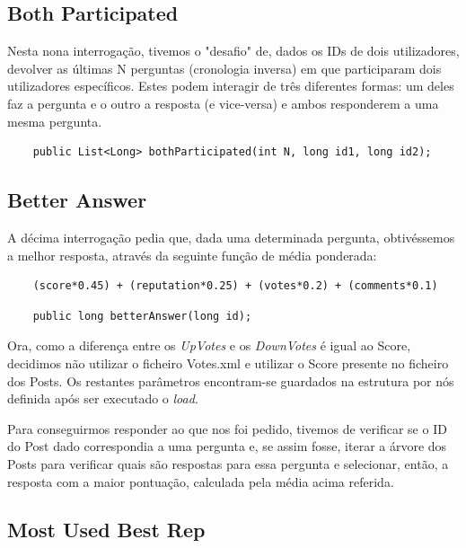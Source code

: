 \documentclass[a4paper, 11pt, oneside]{article}
\begin{document}
\subsection{Both Participated}

Nesta nona interrogação, tivemos o "desafio" de, dados os IDs de dois utilizadores, devolver as últimas N perguntas (cronologia inversa) em que participaram dois 
utilizadores específicos. Estes podem interagir de três diferentes formas: um deles faz a pergunta e o outro a resposta (e vice-versa) e ambos responderem a uma mesma pergunta.

\begin{lstlisting}
	public List<Long> bothParticipated(int N, long id1, long id2);
\end{lstlisting}


\subsection{Better Answer}

A décima interrogação pedia que, dada uma determinada pergunta, obtivéssemos a melhor resposta, através da seguinte função de média ponderada:

\begin{verbatim}
	(score*0.45) + (reputation*0.25) + (votes*0.2) + (comments*0.1)
\end{verbatim}

\begin{lstlisting}
	public long betterAnswer(long id);
\end{lstlisting}

Ora, como a diferença entre os \textit{UpVotes} e os \textit{DownVotes} é igual ao Score, decidimos não utilizar o ficheiro Votes.xml e utilizar o Score presente no 
ficheiro dos Posts. Os restantes parâmetros encontram-se guardados na estrutura por nós definida após ser executado o \textit{load}.

Para conseguirmos responder ao que nos foi pedido, tivemos de verificar se o ID do Post dado correspondia a uma pergunta e, se assim fosse, iterar a árvore dos Posts 
para verificar quais são respostas para essa pergunta e selecionar, então, a resposta com a maior pontuação, calculada pela média acima referida.


\subsection{Most Used Best Rep}
\end{document}
